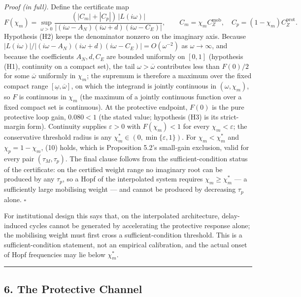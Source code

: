 \documentclass[11pt]{article}
\begin{document}
\emph{Proof (in full).} Define the certificate map
\[F(\chi_m) = \sup_{\omega>0} \frac{(|C_m|+|C_p|)\,|L(i\omega)|}{|(i\omega-A_N)(i\omega+d)(i\omega-C_E)|}, \qquad C_m = \chi_m C_Z^{\mathrm{mob}}, \quad C_p = (1-\chi_m)C_Z^{\mathrm{prot}}.\]
Hypothesis (H2) keeps the denominator nonzero on the imaginary axis.
Because
\(|L(i\omega)|/|(i\omega-A_N)(i\omega+d)(i\omega-C_E)| = O(\omega^{-2})\)
as \(\omega \to \infty\), and because the coefficients \(A_N, d, C_E\)
are bounded uniformly on \([0,1]\) (hypothesis (H1), continuity on a
compact set), the tail \(\omega > \overline\omega\) contributes less
than \(F(0)/2\) for some \(\overline\omega\) uniformly in \(\chi_m\);
the supremum is therefore a maximum over the fixed compact range
\([\underline\omega, \overline\omega]\), on which the integrand is
jointly continuous in \((\omega, \chi_m)\), so \(F\) is continuous in
\(\chi_m\) (the maximum of a jointly continuous function over a fixed
compact set is continuous). At the protective endpoint, \(F(0)\) is the
pure protective loop gain, \(0.080 < 1\) (the stated value; hypothesis
(H3) is its strict-margin form). Continuity supplies \(\varepsilon > 0\)
with \(F(\chi_m) < 1\) for every \(\chi_m < \varepsilon\); the
conservative threshold radius is any
\(\chi_m^* \in (0, \min\{\varepsilon, 1\})\). For \(\chi_m < \chi_m^*\)
and \(\chi_p = 1 - \chi_m\), (10) holds, which is Proposition 5.2's
small-gain exclusion, valid for every pair \((\tau_M, \tau_p)\). The
final clause follows from the sufficient-condition status of the
certificate: on the certified weight range no imaginary root can be
produced by any \(\tau_p\), so a Hopf of the interpolated system
requires \(\chi_m \ge \chi_m^*\) --- a sufficiently large mobilising
weight --- and cannot be produced by decreasing \(\tau_p\) alone. \ensuremath{\square}

For institutional design this says that, on the interpolated
architecture, delay-induced cycles cannot be generated by accelerating
the protective response alone; the mobilising weight must first cross a
sufficient-condition threshold. This is a sufficient-condition
statement, not an empirical calibration, and the actual onset of Hopf
frequencies may lie below \(\chi_m^*\).

\begin{center}\rule{0.5\linewidth}{0.5pt}\end{center}

\subsection{6. The Protective Channel}\label{the-protective-channel}
\end{document}
